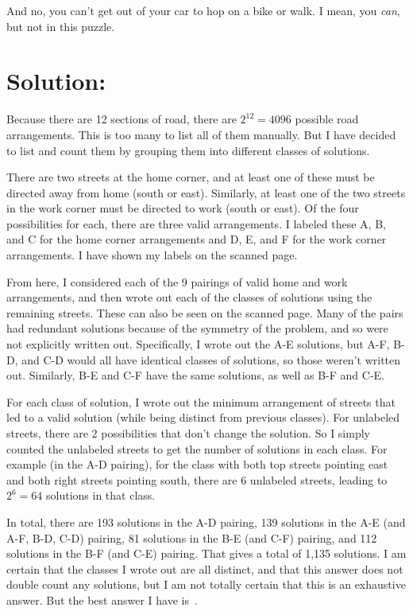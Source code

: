 \documentclass{article}
\begin{document}
And no, you can't get out of your car to hop on a bike or walk.
I mean, you \textit{can}, but not in this puzzle.



\section*{Solution:}

Because there are 12 sections of road, there are $2^{12}=4096$ possible road arrangements.
This is too many to list all of them manually.
But I have decided to list and count them by grouping them into different classes of solutions.

There are two streets at the home corner, and at least one of these must be directed away from home (south or east).
Similarly, at least one of the two streets in the work corner must be directed to work (south or east).
Of the four possibilities for each, there are three valid arrangements.
I labeled these A, B, and C for the home corner arrangements and D, E, and F for the work corner arrangements.
I have shown my labels on the scanned page.

From here, I considered each of the 9 pairings of valid home and work arrangements, and then wrote out each of the classes of solutions using the remaining streets.
These can also be seen on the scanned page.
Many of the pairs had redundant solutions because of the symmetry of the problem, and so were not explicitly written out.
Specifically, I wrote out the A-E solutions, but A-F, B-D, and C-D would all have identical classes of solutions, so those weren't written out.
Similarly, B-E and C-F have the same solutions, as well as B-F and C-E.

For each class of solution, I wrote out the minimum arrangement of streets that led to a valid solution (while being distinct from previous classes).
For unlabeled streets, there are 2 possibilities that don't change the solution.
So I simply counted the unlabeled streets to get the number of solutions in each class.
For example (in the A-D pairing), for the class with both top streets pointing east and both right streets pointing south, there are 6 unlabeled streets, leading to $2^{6}=64$ solutions in that class.

In total, there are 193 solutions in the A-D pairing, 139 solutions in the A-E (and A-F, B-D, C-D) pairing, 81 solutions in the B-E (and C-F) pairing, and 112 solutions in the B-F (and C-E) pairing.
That gives a total of 1,135 solutions.
I am certain that the classes I wrote out are all distinct, and that this answer does not double count any solutions, but I am not totally certain that this is an exhaustive answer. But the best answer I have is
\,.


\end{document}
